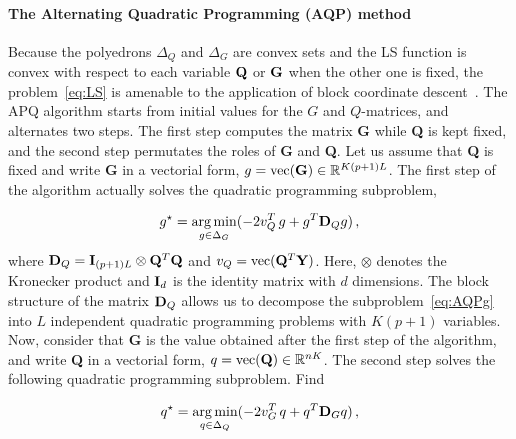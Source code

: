 \paragraph{The Alternating Quadratic Programming (AQP) method} Because the
poly\-edrons $\Delta_Q$ and $\Delta_G$ are convex sets and the LS function is
convex with respect to each variable ${\bf Q}$ or ${\bf G}$ when the other one
is fixed, the problem~\eqref{eq:LS} is amenable to the application of block
coordinate descent~\citep{Bertsekas1995}. The APQ algorithm starts from initial
values for the $G$ and $Q$-matrices, and alternates two steps. The first step
computes the matrix {\bf G} while {\bf Q} is kept fixed, and the second step
permutates the roles of {\bf G} and {\bf Q}. Let us assume that {\bf Q} is fixed
and write {\bf G} in a vectorial form, $g = {\rm vec({\bf G})} \in
\mathbb{R}^{K(p + 1)L}$. The first step of the algorithm actually solves the
quadratic programming subproblem, 

\begin{equation}
\begin{aligned}
g^\star = \underset{g \in \Delta_G}{\arg \min}  ( -2  v^T_Q \, g + g^T {\bf D}_Q g ) \, ,  
\end{aligned}
\label{eq:AQPg}
\end{equation}
\noindent where ${\bf D}_Q = {\bf I}_{(p+1)L} \otimes {\bf Q}^T {\bf Q}$ and
$v_Q = {\rm vec}({\bf Q}^T {\bf Y})$. Here, $\otimes$ denotes the Kronecker
product and ${\bf I}_d$ is the identity matrix with $d$ dimensions. The block
structure of the matrix ${\bf D}_Q$ allows us to decompose the
subproblem~\eqref{eq:AQPg} into $L$ independent quadratic programming problems
with $K(p + 1)$ variables. Now, consider that {\bf G} is the value obtained
after the first step of the algorithm, and write {\bf Q} in a vectorial form, $q
= {\rm vec({\bf Q})} \in \mathbb{R}^{nK}$. The second step solves the following
quadratic programming subproblem. Find

\begin{equation}
\begin{aligned}
q^\star = \underset{q \in \Delta_Q}{\arg \min} ( -2 v^T_G \, q + q^T {\bf D}_G q ) \,  ,
\end{aligned}
\label{eq:AQPq}
\end{equation}

